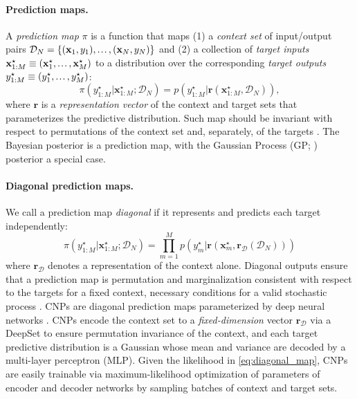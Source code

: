 \documentclass[twoside]{article}
\renewcommand{\r}{\mathbf{r}}
\renewcommand{\ldots}{\mathinner{.\mkern1.5mu.\mkern1.5mu.}}
\newcommand{\x}{\mathbf{x}}
\newcommand{\data}{\mathcal{D}}
\newcommand{\xt}{\mathbf{x}^\star}
\newcommand{\yt}{{y}^\star}
\begin{document}
\paragraph{Prediction maps.}

A \emph{prediction map} $\pi$ is a function that maps (1) a \emph{context set} of input/output pairs $\data_N = \{(\x_1, y_1), \ldots, (\x_N, y_N)\}$ and (2) a collection of \emph{target inputs} $\xt_{1:M} \equiv (\xt_1, \ldots, \xt_M)$ to a distribution over the corresponding \emph{target outputs} $\yt_{1:M} \equiv (\yt_{1}, \ldots, \yt_M)$: 
\begin{equation} 
\label{eq:predictionmap}
 \pi\left(\yt_{1:M} \vert \xt_{1:M}; \data_N \right) = %
p\left(\yt_{1:M}| \r(\xt_{1:M}, \data_N) \right), 
\end{equation}
where $\r$ is a \emph{representation vector} of the context and target sets that parameterizes the predictive distribution. 
Such map should be invariant with respect to permutations of the context set and, separately, of the targets \citep{foong2020meta}. 
The Bayesian posterior is a prediction map, with the Gaussian Process (GP; \citealp{rasmussen2006gaussian}) posterior a special case.

\vspace{-0.25em}
\paragraph{Diagonal prediction maps.}

We call a prediction map \emph{diagonal} if it represents and predicts each target independently:
\begin{equation}
\label{eq:diagonal_map}
 \pi(\yt_{1:M} \vert \xt_{1:M}; \data_N ) =
 \prod_{m=1}^M p\left(\yt_m| \r(\xt_m, \r_{\data}(\data_N))\right)
\end{equation}
%
where $\r_{\data}$ denotes a representation of the context alone. Diagonal outputs ensure that a prediction map is permutation and marginalization consistent with respect to the targets for a fixed context, necessary conditions for a valid stochastic process \citep{markou2022practical}.
%
CNPs are diagonal prediction maps parameterized by deep neural networks \citep{garnelo2018conditional}. CNPs encode the context set to a \emph{fixed-dimension} vector $\r_{\data}$ via a DeepSet  \citep{zaheer2017deep} to ensure permutation invariance of the context, and each target predictive distribution is a Gaussian whose mean and variance are decoded by a multi-layer perceptron (MLP).
Given the likelihood in \cref{eq:diagonal_map}, CNPs are easily trainable via maximum-likelihood optimization of parameters of encoder and decoder networks by sampling batches of context and target sets.
\end{document}
